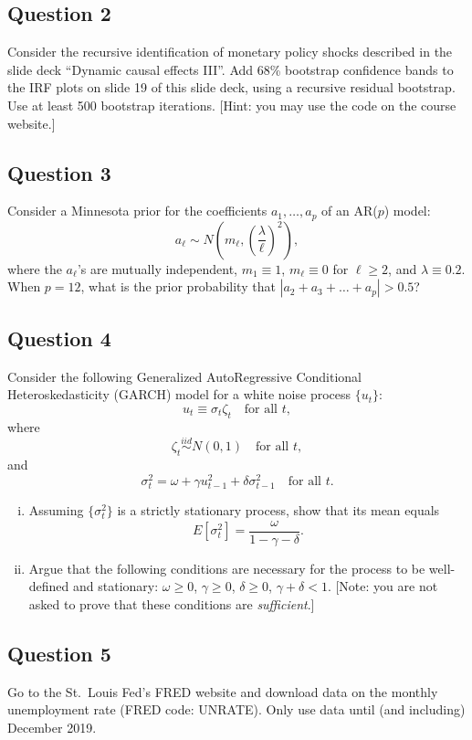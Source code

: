 \documentclass[12pt]{article}
\theoremstyle{plain}
\begin{document}
\subsection*{Question 2}
Consider the recursive identification of monetary policy shocks described in the slide deck ``Dynamic causal effects III''. Add 68\% bootstrap confidence bands to the IRF plots on slide 19 of this slide deck, using a recursive residual bootstrap. Use at least 500 bootstrap iterations. [Hint: you may use the code on the course website.]

\subsection*{Question 3}
Consider a Minnesota prior for the coefficients $a_1,\dots,a_p$ of an AR($p$) model:
\[a_\ell \sim N\left(m_\ell, \left(\frac{\lambda}{\ell}\right)^2\right),\]
where the $a_\ell$'s are mutually independent, $m_1 \equiv 1$, $m_\ell \equiv 0$ for $\ell \geq 2$, and $\lambda \equiv 0.2$. When $p=12$, what is the prior probability that $|a_2+a_3+\dots+a_p|>0.5$?

\subsection*{Question 4}
Consider the following Generalized AutoRegressive Conditional Heteroskedasticity (GARCH) model for a white noise process $\lbrace u_t \rbrace$:
\[u_t \equiv \sigma_t \zeta_t \quad \text{for all } t,\]
where
\[\zeta_t \overset{iid}{\sim} N(0,1) \quad \text{for all } t,\]
and
\[\sigma_t^2 = \omega + \gamma u_{t-1}^2 + \delta \sigma_{t-1}^2 \quad \text{for all } t.\]

\begin{enumerate}[i)]
\item Assuming $\lbrace \sigma_t^2 \rbrace$ is a strictly stationary process, show that its mean equals
\[E[\sigma_t^2] = \frac{\omega}{1-\gamma-\delta}.\]
\item Argue that the following conditions are necessary for the process to be well-defined and stationary: $\omega \geq 0$, $\gamma \geq 0$, $\delta \geq 0$, $\gamma+\delta<1$. [Note: you are not asked to prove that these conditions are \emph{sufficient}.]
\end{enumerate}
\clearpage

\subsection*{Question 5}
Go to the St.\ Louis Fed's FRED website and download data on the monthly unemployment rate (FRED code: UNRATE). Only use data until (and including) December 2019.
\end{document}
